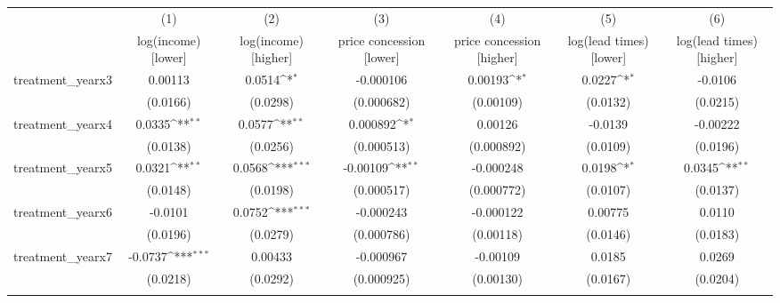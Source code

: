{
\def\sym#1{\ifmmode^{#1}\else\(^{#1}\)\fi}
\begin{tabular}{l*{6}{c}}
\toprule
            &\multicolumn{1}{c}{(1)}&\multicolumn{1}{c}{(2)}&\multicolumn{1}{c}{(3)}&\multicolumn{1}{c}{(4)}&\multicolumn{1}{c}{(5)}&\multicolumn{1}{c}{(6)}\\
            &\multicolumn{1}{c}{log(income) [lower]}&\multicolumn{1}{c}{log(income) [higher]}&\multicolumn{1}{c}{price concession [lower]}&\multicolumn{1}{c}{price concession [higher]}&\multicolumn{1}{c}{log(lead times) [lower]}&\multicolumn{1}{c}{log(lead times) [higher]}\\
\midrule
treatment\_yearx3&     0.00113         &      0.0514\sym{*}  &   -0.000106         &     0.00193\sym{*}  &      0.0227\sym{*}  &     -0.0106         \\
            &    (0.0166)         &    (0.0298)         &  (0.000682)         &   (0.00109)         &    (0.0132)         &    (0.0215)         \\
\addlinespace
treatment\_yearx4&      0.0335\sym{**} &      0.0577\sym{**} &    0.000892\sym{*}  &     0.00126         &     -0.0139         &    -0.00222         \\
            &    (0.0138)         &    (0.0256)         &  (0.000513)         &  (0.000892)         &    (0.0109)         &    (0.0196)         \\
\addlinespace
treatment\_yearx5&      0.0321\sym{**} &      0.0568\sym{***}&    -0.00109\sym{**} &   -0.000248         &      0.0198\sym{*}  &      0.0345\sym{**} \\
            &    (0.0148)         &    (0.0198)         &  (0.000517)         &  (0.000772)         &    (0.0107)         &    (0.0137)         \\
\addlinespace
treatment\_yearx6&     -0.0101         &      0.0752\sym{***}&   -0.000243         &   -0.000122         &     0.00775         &      0.0110         \\
            &    (0.0196)         &    (0.0279)         &  (0.000786)         &   (0.00118)         &    (0.0146)         &    (0.0183)         \\
\addlinespace
treatment\_yearx7&     -0.0737\sym{***}&     0.00433         &   -0.000967         &    -0.00109         &      0.0185         &      0.0269         \\
            &    (0.0218)         &    (0.0292)         &  (0.000925)         &   (0.00130)         &    (0.0167)         &    (0.0204)         \\
\addlinespace

\end{tabular}}
